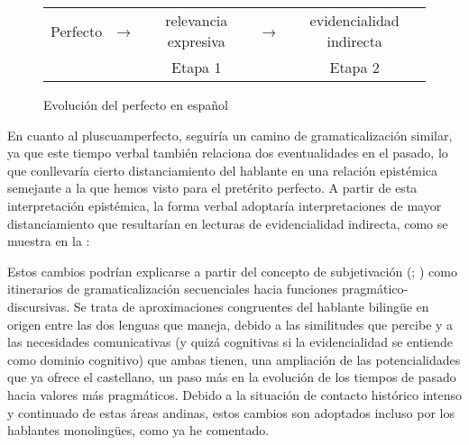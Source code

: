 \documentclass[output=paper]{../langscibook}
\begin{document}
\begin{figure}
\small
\begin{tabular}{ccccc}
Perfecto & → &    relevancia expresiva & → &   evidencialidad indirecta\\

 & &                      Etapa 1       & &                        Etapa 2\\
\end{tabular}
\caption{\label{fig:palacios:2} Evolución del perfecto en español}
\end{figure}

En cuanto al pluscuamperfecto, seguiría un camino de gramaticalización similar, ya que este tiempo verbal también relaciona dos eventualidades en el pasado, lo que conllevaría cierto distanciamiento del hablante en una relación epistémica semejante a la que hemos visto para el pretérito perfecto. A partir de esta interpretación epistémica, la forma verbal adoptaría interpretaciones de mayor distanciamiento que resultarían en lecturas de evidencialidad indirecta, como se muestra en la :


\begin{figure}
\small
{}
\end{figure}

Estos cambios podrían explicarse a partir del concepto de subjetivación (\citealt{Traugott1982}; \citealt{TraugottDasher2002}) como itinerarios de gramaticalización secuenciales hacia funciones pragmático-discursivas. Se trata de aproximaciones congruentes del hablante bilingüe en origen entre las dos lenguas que maneja, debido a las similitudes que percibe y a las necesidades comunicativas (y quizá cognitivas si la evidencialidad se entiende como dominio cognitivo) que ambas tienen, una ampliación de las potencialidades que ya ofrece el castellano, un paso más en la evolución de los tiempos de pasado hacia valores más pragmáticos. Debido a la situación de contacto histórico intenso y continuado de estas áreas andinas, estos cambios son adoptados incluso por los hablantes monolingües, como ya he comentado.
\end{document}
